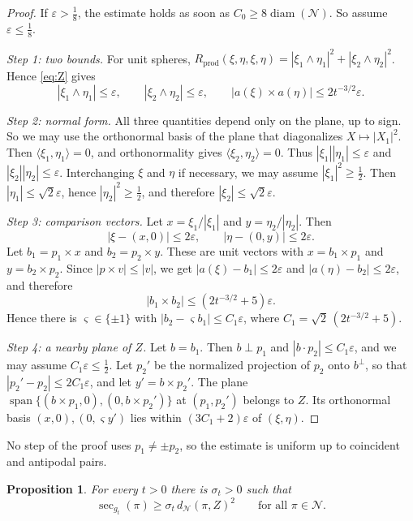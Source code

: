 \documentclass[11pt]{amsart}
\newtheorem{proposition}[theorem]{Proposition}
\theoremstyle{definition}
\theoremstyle{remark}
\newcommand{\sect}{\operatorname{sec}}
\newcommand{\Gr}{\mathcal{N}}
\newcommand{\Span}{\operatorname{span}}
\begin{document}
\begin{proof}
If $\varepsilon>\frac18$, the estimate holds as soon as $C_0\ge8\operatorname{diam}(\Gr)$. So assume $\varepsilon\le\frac18$.

\emph{Step 1: two bounds.} For unit spheres, $R_{\mathrm{prod}}(\xi,\eta,\xi,\eta)=|\xi_1\wedge\eta_1|^2+|\xi_2\wedge\eta_2|^2$. Hence \eqref{eq:Z} gives
\[ |\xi_1\wedge\eta_1|\le\varepsilon,\qquad |\xi_2\wedge\eta_2|\le\varepsilon,\qquad |a(\xi)\times a(\eta)|\le2t^{-3/2}\varepsilon . \]

\emph{Step 2: normal form.} All three quantities depend only on the plane, up to sign. So we may use the orthonormal basis of the plane that diagonalizes $X\mapsto|X_1|^2$. Then $\langle\xi_1,\eta_1\rangle=0$, and orthonormality gives $\langle\xi_2,\eta_2\rangle=0$. Thus $|\xi_1||\eta_1|\le\varepsilon$ and $|\xi_2||\eta_2|\le\varepsilon$. Interchanging $\xi$ and $\eta$ if necessary, we may assume $|\xi_1|^2\ge\frac12$. Then $|\eta_1|\le\sqrt2\varepsilon$, hence $|\eta_2|^2\ge\frac12$, and therefore $|\xi_2|\le\sqrt2\varepsilon$.

\emph{Step 3: comparison vectors.} Let $x=\xi_1/|\xi_1|$ and $y=\eta_2/|\eta_2|$. Then
\[ |\xi-(x,0)|\le2\varepsilon,\qquad |\eta-(0,y)|\le2\varepsilon . \]
Let $b_1=p_1\times x$ and $b_2=p_2\times y$. These are unit vectors with $x=b_1\times p_1$ and $y=b_2\times p_2$. Since $|p\times v|\le|v|$, we get $|a(\xi)-b_1|\le2\varepsilon$ and $|a(\eta)-b_2|\le2\varepsilon$, and therefore
\[ |b_1\times b_2|\le(2t^{-3/2}+5)\varepsilon . \]
Hence there is $\varsigma\in\{\pm1\}$ with $|b_2-\varsigma b_1|\le C_1\varepsilon$, where $C_1=\sqrt2\,(2t^{-3/2}+5)$.

\emph{Step 4: a nearby plane of $Z$.} Let $b=b_1$. Then $b\perp p_1$ and $|b\cdot p_2|\le C_1\varepsilon$, and we may assume $C_1\varepsilon\le\frac12$. Let $p_2'$ be the normalized projection of $p_2$ onto $b^\perp$, so that $|p_2'-p_2|\le2C_1\varepsilon$, and let $y'=b\times p_2'$. The plane $\Span\{(b\times p_1,0),(0,b\times p_2')\}$ at $(p_1,p_2')$ belongs to $Z$. Its orthonormal basis $(x,0),(0,\varsigma y')$ lies within $(3C_1+2)\varepsilon$ of $(\xi,\eta)$.
\end{proof}

No step of the proof uses $p_1\ne\pm p_2$, so the estimate is uniform up to coincident and antipodal pairs.

\begin{proposition}\label{prop:growth}
For every $t>0$ there is $\sigma_t>0$ such that
\[ \sect_{g_t}(\pi)\ge\sigma_t\,d_\Gr(\pi,Z)^2\qquad\text{for all }\pi\in\Gr . \]
\end{proposition}
\end{document}
